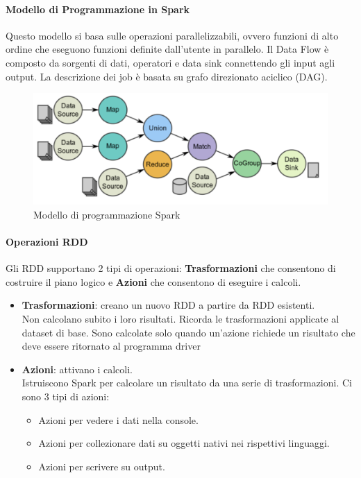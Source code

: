 \documentclass{article}
\begin{document}
\begin{appendices}
\paragraph{Modello di Programmazione in Spark}
Questo modello si basa sulle operazioni parallelizzabili, ovvero funzioni di alto ordine che eseguono funzioni definite dall'utente in parallelo. Il Data Flow è composto da sorgenti di dati, operatori e data sink connettendo gli input agli output. La descrizione dei job è basata su grafo direzionato aciclico (DAG).
\begin{figure}[H]
    \centering
    \includegraphics[scale=0.3]{img/modello programmazione spark.png}
    \caption{Modello di programmazione Spark}
\end{figure}\noindent

\paragraph{Operazioni RDD}
Gli RDD supportano 2 tipi di operazioni: \textbf{Trasformazioni} che consentono di costruire il piano logico e \textbf{Azioni} che consentono di eseguire i calcoli.
\begin{itemize}
    \item \textbf{Trasformazioni}: creano un nuovo RDD a partire da RDD esistenti. \\
    Non calcolano subito i loro risultati. Ricorda le trasformazioni applicate al dataset di base. Sono calcolate solo quando un'azione richiede un risultato che deve essere ritornato al programma driver
    \item \textbf{Azioni}: attivano i calcoli. \\
    Istruiscono Spark per calcolare un risultato da una serie di trasformazioni. Ci sono 3 tipi di azioni:
    \begin{itemize}
        \item Azioni per vedere i dati nella console.
        \item Azioni per collezionare dati su oggetti nativi nei rispettivi linguaggi.
        \item Azioni per scrivere su output.
    \end{itemize}
\end{itemize}


\end{appendices}
\end{document}

